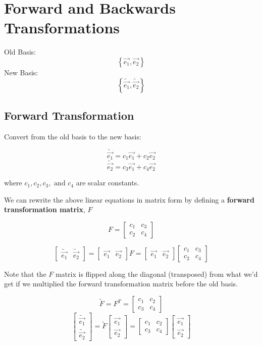 \documentclass{report}
\begin{document}


\chapter{Forward and Backwards Transformations}
Old Basis:
$$
\left\{ \vec{e_1}, \vec{e_2} \right\} 
$$ 
New Basis:
$$
\left\{ \tilde{\vec{e_1}}, \tilde{\vec{e_2}} \right\} 
$$ 

\section{Forward Transformation}
Convert from the old basis to the new basis:

$$ \tilde{\vec{e_1}} = c_1 \vec{e_1} + c_2 \vec{e_2} $$
$$ \tilde{\vec{e_2}} = c_3 \vec{e_1} + c_4 \vec{e_2} $$


where $c_1, c_2, c_3,\text{ and } c_4$ are scalar constants.

We can rewrite the above linear equations in matrix form by defining a \textbf{forward transformation matrix}, $F$

$$ F = \begin{bmatrix} c_1 & c_3 \\ c_2 & c_4 \end{bmatrix}  $$ 

$$ \begin{bmatrix} \tilde{\vec{e_1}} & \tilde{\vec{e_2}} \end{bmatrix} = \begin{bmatrix} \vec{e_1} & \vec{e_2} \end{bmatrix} F = \begin{bmatrix} \vec{e_1} & \vec{e_2} \end{bmatrix} \begin{bmatrix} c_1 & c_3 \\ c_2 & c_4 \end{bmatrix}  $$ 

Note that the $F$ matrix is flipped along the diagonal (transposed) from what we'd get if we multiplied the forward transformation matrix before the old basis.

$$ \tilde{F} = F^T = \begin{bmatrix} c_1 & c_2 \\ c_3 & c_4 \end{bmatrix}  $$ 
$$ \begin{bmatrix} \tilde{\vec{e_1}} \\ \tilde{\vec{e_2}} \end{bmatrix} = 	\tilde{F} \begin{bmatrix} \vec{e_1} \\ \vec{e_2} \end{bmatrix} = \begin{bmatrix} c_1 & c_2 \\ c_3 & c_4 \end{bmatrix}\begin{bmatrix} \vec{e_1} \\ \vec{e_2} \end{bmatrix}   $$ 
\end{document}
